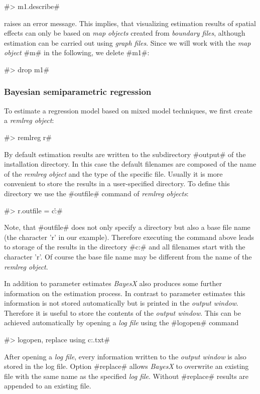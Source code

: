 #> m1.describe#

raises an error message. This implies, that visualizing estimation
results of spatial effects can only be based on {\it map objects}
created from {\it boundary files}, although estimation can be
carried out using {\it graph files}. Since we will work with the
{\it map object} #m# in the following, we delete #m1#:

#> drop m1#

\subsubsection{Bayesian semiparametric
regression}\label{zambia_reml_regression}

To estimate a regression model based on mixed model techniques, we
first create a {\it remlreg object}:

#> remlreg r#

By default estimation results are written to the subdirectory
#output# of the installation directory. In this case the default
filenames are composed of the name of the {\it remlreg object} and
the type of the specific file. Usually it is more convenient to
store the results in a user-specified directory. To define this
directory we use the #outfile# command of {\it remlreg objects}:

#> r.outfile = c:\data\r#

Note, that #outfile# does not only specify a directory but also a
base file name (the character 'r' in our example). Therefore
executing the command above leads to storage of the results in the
directory #c:\data# and all filenames start with the character
'r'. Of course the base file name may be different from the name of
the {\it remlreg object}.

In addition to parameter estimates {\it BayesX} also produces some
further information on the estimation process. In contrast to
parameter estimates this information is not stored automatically
but is printed in the {\it output window}. Therefore it is useful
to store the contents of the {\it output window}. This can be
achieved automatically by opening a {\it log file} using the
#logopen# command

#> logopen, replace using c:\data\logreml.txt#

After opening a {\it log file}, every information written to the
{\em output window} is also stored in the log file. Option
#replace# allows {\it BayesX} to overwrite an existing file with
the same name as the specified {\it log file}. Without #replace#
results are appended to an existing file.

